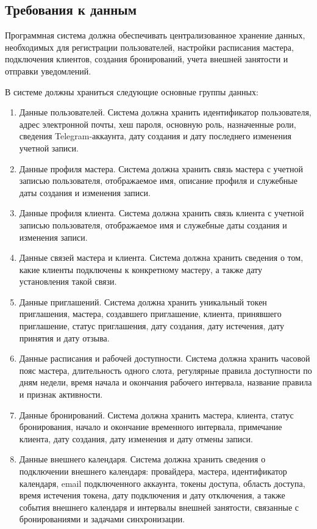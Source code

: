 \subsection{Требования к данным}

Программная система должна обеспечивать централизованное хранение данных, необходимых для регистрации пользователей, настройки расписания мастера, подключения клиентов, создания бронирований, учета внешней занятости и отправки уведомлений.

В системе должны храниться следующие основные группы данных:
\begin{enumerate}
\item Данные пользователей. Система должна хранить идентификатор пользователя, адрес электронной почты, хеш пароля, основную роль, назначенные роли, сведения Telegram-аккаунта, дату создания и дату последнего изменения учетной записи.
\item Данные профиля мастера. Система должна хранить связь мастера с учетной записью пользователя, отображаемое имя, описание профиля и служебные даты создания и изменения записи.
\item Данные профиля клиента. Система должна хранить связь клиента с учетной записью пользователя, отображаемое имя и служебные даты создания и изменения записи.
\item Данные связей мастера и клиента. Система должна хранить сведения о том, какие клиенты подключены к конкретному мастеру, а также дату установления такой связи.
\item Данные приглашений. Система должна хранить уникальный токен приглашения, мастера, создавшего приглашение, клиента, принявшего приглашение, статус приглашения, дату создания, дату истечения, дату принятия и дату отзыва.
\item Данные расписания и рабочей доступности. Система должна хранить часовой пояс мастера, длительность одного слота, регулярные правила доступности по дням недели, время начала и окончания рабочего интервала, название правила и признак активности.
\item Данные бронирований. Система должна хранить мастера, клиента, статус бронирования, начало и окончание временного интервала, примечание клиента, дату создания, дату изменения и дату отмены записи.
\item Данные внешнего календаря. Система должна хранить сведения о подключении внешнего календаря: провайдера, мастера, идентификатор календаря, email подключенного аккаунта, токены доступа, область доступа, время истечения токена, дату подключения и дату отключения, а также события внешнего календаря и интервалы внешней занятости, связанные с бронированиями и задачами синхронизации.

\end{enumerate}
